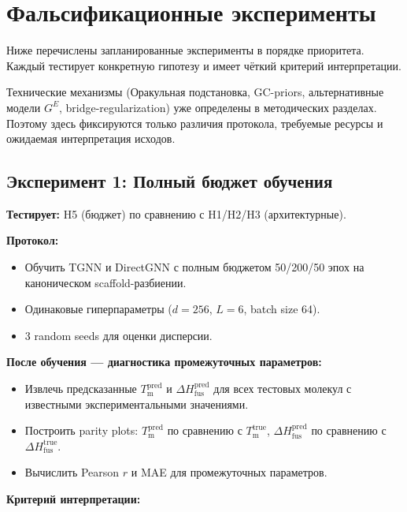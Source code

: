 \documentclass[11pt]{article}
\begin{document}
\section{Фальсификационные эксперименты}

Ниже перечислены запланированные эксперименты в порядке приоритета. Каждый тестирует конкретную гипотезу и имеет чёткий критерий интерпретации.

Технические механизмы (Оракульная подстановка, GC-priors, альтернативные модели $G^E$, bridge-regularization) уже определены в методических разделах. Поэтому здесь фиксируются только различия протокола, требуемые ресурсы и ожидаемая интерпретация исходов.

\subsection{Эксперимент 1: Полный бюджет обучения}
\label{subsec:exp-full-budget}

\textbf{Тестирует:} H5 (бюджет) по сравнению с H1/H2/H3 (архитектурные).

\textbf{Протокол:}
\begin{itemize}
  \item Обучить TGNN и DirectGNN с полным бюджетом 50/200/50 эпох на каноническом scaffold-разбиении.
  \item Одинаковые гиперпараметры ($d = 256$, $L = 6$, batch size 64).
  \item 3 random seeds для оценки дисперсии.
\end{itemize}

\textbf{После обучения --- диагностика промежуточных параметров:}
\begin{itemize}
  \item Извлечь предсказанные $T_{\mathrm{m}}^{\mathrm{pred}}$ и $\Delta H_{\mathrm{fus}}^{\mathrm{pred}}$ для всех тестовых молекул с известными экспериментальными значениями.
  \item Построить parity plots: $T_{\mathrm{m}}^{\mathrm{pred}}$ по сравнению с $T_{\mathrm{m}}^{\mathrm{true}}$, $\Delta H_{\mathrm{fus}}^{\mathrm{pred}}$ по сравнению с $\Delta H_{\mathrm{fus}}^{\mathrm{true}}$.
  \item Вычислить Pearson $r$ и MAE для промежуточных параметров.
\end{itemize}

\textbf{Критерий интерпретации:}
\end{document}

